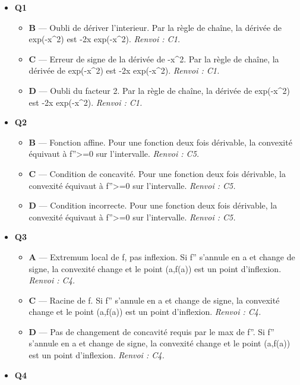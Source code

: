 \begin{itemize}
  \item \textbf{Q1}
  \begin{itemize}
    \item \textbf{B} — Oubli de dériver l'interieur. Par la règle de chaîne, la dérivée de exp(-x\textasciicircum{}2) est -2x exp(-x\textasciicircum{}2). \emph{Renvoi : C1.}
    \item \textbf{C} — Erreur de signe de la dérivée de -x\textasciicircum{}2. Par la règle de chaîne, la dérivée de exp(-x\textasciicircum{}2) est -2x exp(-x\textasciicircum{}2). \emph{Renvoi : C1.}
    \item \textbf{D} — Oubli du facteur 2. Par la règle de chaîne, la dérivée de exp(-x\textasciicircum{}2) est -2x exp(-x\textasciicircum{}2). \emph{Renvoi : C1.}
  \end{itemize}
  \item \textbf{Q2}
  \begin{itemize}
    \item \textbf{B} — Fonction affine. Pour une fonction deux fois dérivable, la convexité équivaut à f''>=0 sur l'intervalle. \emph{Renvoi : C5.}
    \item \textbf{C} — Condition de concavité. Pour une fonction deux fois dérivable, la convexité équivaut à f''>=0 sur l'intervalle. \emph{Renvoi : C5.}
    \item \textbf{D} — Condition incorrecte. Pour une fonction deux fois dérivable, la convexité équivaut à f''>=0 sur l'intervalle. \emph{Renvoi : C5.}
  \end{itemize}
  \item \textbf{Q3}
  \begin{itemize}
    \item \textbf{A} — Extremum local de f, pas inflexion. Si f'' s'annule en a et change de signe, la convexité change et le point (a,f(a)) est un point d'inflexion. \emph{Renvoi : C4.}
    \item \textbf{C} — Racine de f. Si f'' s'annule en a et change de signe, la convexité change et le point (a,f(a)) est un point d'inflexion. \emph{Renvoi : C4.}
    \item \textbf{D} — Pas de changement de concavité requis par le max de f''. Si f'' s'annule en a et change de signe, la convexité change et le point (a,f(a)) est un point d'inflexion. \emph{Renvoi : C4.}
  \end{itemize}
  \item \textbf{Q4}
  \begin{itemize}

\end{itemize}
\end{itemize}
